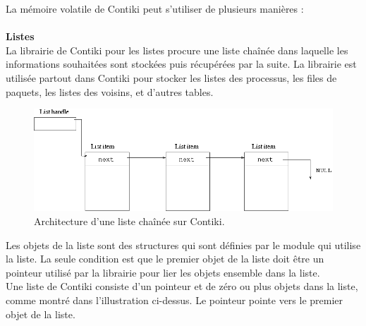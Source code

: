 			La mémoire volatile de Contiki peut s'utiliser de plusieurs manières :\\ \\
			\textbf{Listes}\\
				La librairie de Contiki pour les listes procure une liste chaînée dans laquelle les informations souhaitées sont stockées puis récupérées par la suite. La librairie est utilisée partout dans Contiki pour stocker les listes des processus, les files de paquets, les listes des voisins, et d'autres tables.\\
				\begin{figure}[htp]
					\centering
					\includegraphics[width=16cm]{images/linked-list}
					\caption{Architecture d'une liste chaînée sur Contiki.}
					\label{fig:list}
				\end{figure}
				Les objets de la liste sont des structures qui sont définies par le module qui utilise la liste. La seule condition est que le premier objet de la liste doit être un pointeur utilisé par la librairie pour lier les objets ensemble dans la liste.\\
				Une liste de Contiki consiste d'un pointeur et de zéro ou plus objets dans la liste, comme montré dans l'illustration ci-dessus. Le pointeur pointe vers le premier objet de la liste.\\
				
